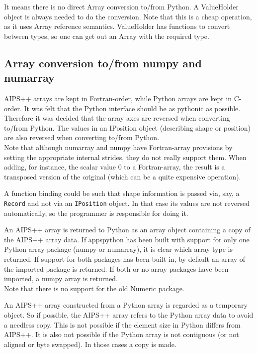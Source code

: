 It means there is no direct Array conversion to/from Python. A
ValueHolder object is always needed to do the conversion. Note that
this is a cheap operation, as it uses Array reference semantics.
ValueHolder has functions to convert between types, so one can get
out an Array with the required type.

\subsection{Array conversion to/from numpy and numarray}
AIPS++ arrays are kept in Fortran-order, while Python arrays are kept
in C-order. It was felt that the Python interface should be as 
pythonic as possible. Therefore it was decided that the array axes are
reversed when converting to/from Python.
The values in an IPosition object (describing shape or
position) are also reversed when converting to/from Python.
\\Note that although numarray and numpy have Fortran-array provisions
by setting the appropriate internal strides,
they do not really support them. When adding, for instance, the scalar
value 0 to a Fortran-array, the  result is a transposed version of the
original (which can be a quite expensive operation).

A function binding could be such that shape information is passed via, say, a
\texttt{Record} and not via an \texttt{IPosition} object.
In that case its values
are not reversed automatically, so the programmer is
responsible for doing it.

An AIPS++ array is returned to Python as an array object
containing a copy of the AIPS++ array data. If appspython has
been built with support for only one Python array package (numpy or numarray),
it is clear which array type is returned. If support for both
packages has been built in, by default an array of the imported
package is returned. If both or no array packages have been imported, a numpy
array is returned.
\\Note that there is no support for the old Numeric package.

An AIPS++ array constructed from a Python array is regarded as a
temporary object. So if possible, the AIPS++ array refers to the
Python array data to avoid a needless copy. This is not possible if
the element size in Python differs from AIPS++. It is also not
possible if the Python array is not contiguous (or not aligned or
byte swapped). In those cases a copy is made.

